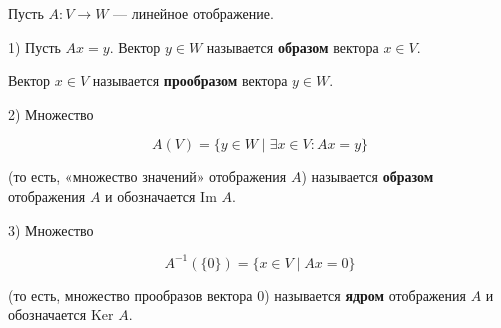 {Пусть \( A : V \to W \) — линейное отображение.

1) Пусть \( A x = y \). Вектор \( y \in W \) называется \textbf{образом} вектора \( x \in V \).

Вектор \( x \in V \) называется \textbf{прообразом} вектора \( y \in W \).

2) Множество 

\[
A (V) = \{ y \in W \mid \exists x \in V : A x = y \}
\]



(то есть, «множество значений» отображения \( A \)) называется \textbf{образом} отображения \( A \) и обозначается \( \text{Im } A \).

3) Множество 



\[
A^{-1} (\{ 0 \}) = \{ x \in V \mid A x = 0 \}
\]

(то есть, множество прообразов вектора \( 0 \)) называется \textbf{ядром} отображения \( A \) и обозначается \( \text{Ker } A \).


}